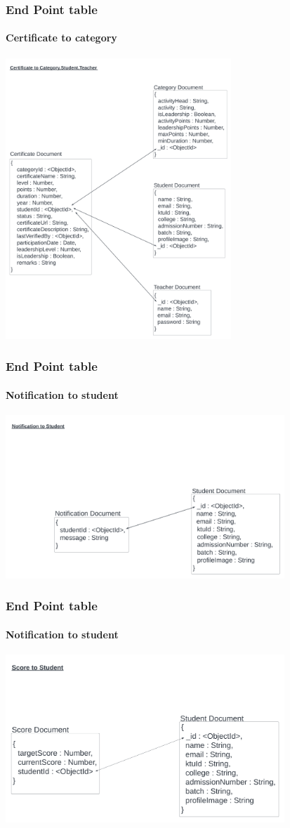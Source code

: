 \begin{frame}
  \frametitle{End Point table }
    \framesubtitle{Certificate to category}
\centering
{\includegraphics[width=8.5cm]{Blank diagram4 (1).png}}
\end{frame}


\begin{frame}
  \frametitle{End Point table }
    \framesubtitle{Notification to student}
\centering
{\includegraphics[width=10.5cm]{Blank diagram 5.png}}
\end{frame}

\begin{frame}
  \frametitle{End Point table }
    \framesubtitle{Notification to student}
\centering
{\includegraphics[width=10.5cm]{Blank diagram 6 (1).png}}
\end{frame}